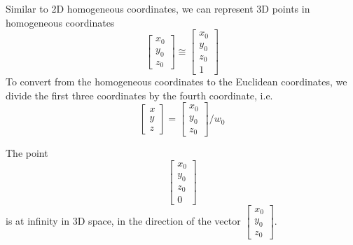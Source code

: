Similar to 2D homogeneous coordinates, we can represent 3D points in homogeneous coordinates \[
    \begin{bmatrix} x_0 \\ y_0 \\ z_0 \end{bmatrix} \cong \begin{bmatrix} x_0 \\ y_0 \\ z_0 \\ 1 \end{bmatrix}
\] To convert from the homogeneous coordinates to the Euclidean coordinates, we divide the first three coordinates by the fourth coordinate, i.e. \[
    \begin{bmatrix} x \\ y \\ z \end{bmatrix} = \begin{bmatrix} x_0 \\ y_0 \\ z_0 \end{bmatrix} / w_0
\]

\begin{remark}
    The point \[ \begin{bmatrix} x_0 \\ y_0 \\ z_0 \\ 0 \end{bmatrix} \] is at infinity in 3D space, in the direction of the vector $\begin{bmatrix} x_0 \\ y_0 \\ z_0 \end{bmatrix}$.
\end{remark}

